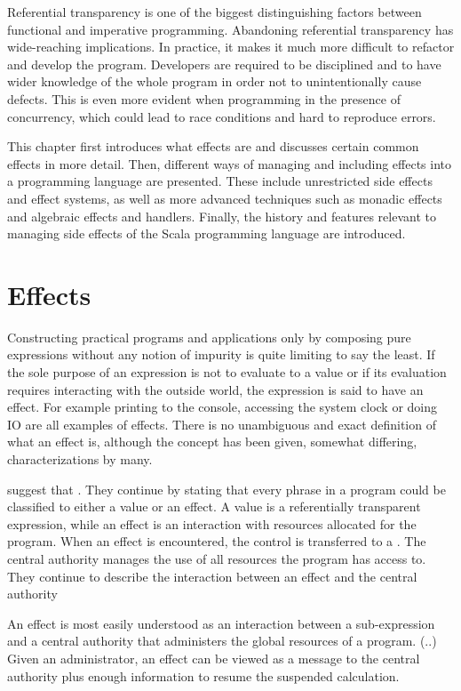 Referential transparency is one of the biggest distinguishing factors between functional and imperative programming. Abandoning referential transparency has wide-reaching implications. In practice, it makes it much more difficult to refactor and develop the program. Developers are required to be disciplined and to have wider knowledge of the whole program in order not to unintentionally cause defects. This is even more evident when programming in the presence of concurrency, which could lead to race conditions and hard to reproduce errors.~\cite[Chapter~3]{sicp}

This chapter first introduces what effects are and discusses certain common effects in more detail. Then, different ways of managing and including effects into a programming language are presented. These include unrestricted side effects and effect systems, as well as more advanced techniques such as monadic effects and algebraic effects and handlers. Finally, the history and features relevant to managing side effects of the Scala programming language are introduced.


\section{Effects} \label{effects}
Constructing practical programs and applications only by composing pure expressions without any notion of impurity is quite limiting to say the least. If the sole purpose of an expression is not to evaluate to a value or if its evaluation requires interacting with the outside world, the expression is said to have an effect. For example printing to the console, accessing the system clock or doing IO are all examples of effects. There is no unambiguous and exact definition of what an effect is, although the concept has been given, somewhat differing, characterizations by many.

\textcite{den-lang-specs} suggest that . They continue by stating that every phrase in a program could be classified to either a value or an effect. A value is a referentially transparent expression, while an effect is an interaction with resources allocated for the program. When an effect is encountered, the control is transferred to a . The central authority manages the use of all resources the program has access to. They continue to describe the interaction between an effect and the central authority
\begin{displayquote}
An effect is most easily understood as an interaction between a sub-expression
and a central authority that administers the global resources of a program. (..) Given an administrator, an effect can be viewed as a message to the central authority plus enough information to resume the suspended calculation.
\end{displayquote}

